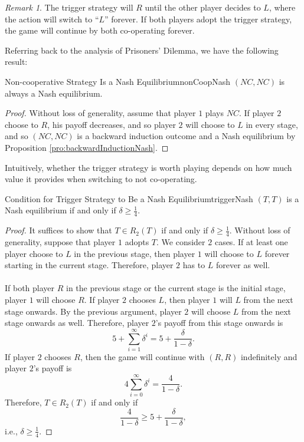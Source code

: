 \documentclass[math]{amznotes}
\theoremstyle{remark}
\newtheorem*{remark}{Remark}
\begin{document}
\begin{notebox}
    \begin{remark}
        The trigger strategy will $R$ until the other player decides to $L$, where the action will switch to ``$L$'' forever. If both players adopt the trigger strategy, the game will continue by both co-operating forever.
    \end{remark}
\end{notebox}
Referring back to the analysis of Prisoners' Dilemma, we have the following result:
\begin{probox}{Non-cooperative Strategy Is a Nash Equilibrium}{nonCoopNash}
    $\left(NC, NC\right)$ is always a Nash equilibrium.
    \tcblower
    \begin{proof}
        Without loss of generality, assume that player $1$ plays $NC$. If player $2$ choose to $R$, his payoff decreases, and so player $2$ will choose to $L$ in every stage, and so $\left(NC, NC\right)$ is a backward induction outcome and a Nash equilibrium by Proposition \ref{pro:backwardInductionNash}.
    \end{proof}
\end{probox}
Intuitively, whether the trigger strategy is worth playing depends on how much value it provides when switching to not co-operating.
\begin{probox}{Condition for Trigger Strategy to Be a Nash Equilibrium}{triggerNash}
    $\left(T, T\right)$ is a Nash equilibrium if and only if $\delta \geq \frac{1}{4}$.
    \tcblower
    \begin{proof}
        It suffices to show that $T \in R_2\left(T\right)$ if and only if $\delta \geq \frac{1}{4}$. Without loss of generality, suppose that player $1$ adopts $T$. We consider $2$ cases. If at least one player choose to $L$ in the previous stage, then player $1$ will choose to $L$ forever starting in the current stage. Therefore, player $2$ has to $L$ forever as well. 
        \\\\
        If both player $R$ in the previous stage or the current stage is the initial stage, player $1$ will choose $R$. If player $2$ chooses $L$, then player $1$ will $L$ from the next stage onwards. By the previous argument, player $2$ will choose $L$ from the next stage onwards as well. Therefore, player $2$'s payoff from this stage onwards is 
        \begin{equation*}
            5 + \sum_{i = 1}^{\infty}\delta^i = 5 + \frac{\delta}{1 - \delta}.
        \end{equation*}
        If player $2$ chooses $R$, then the game will continue with $\left(R, R\right)$ indefinitely and player $2$'s payoff is
        \begin{equation*}
            4\sum_{i = 0}^{\infty}\delta^i = \frac{4}{1 - \delta}.
        \end{equation*}
        Therefore, $T \in R_2\left(T\right)$ if and only if 
        \begin{equation*}
            \frac{4}{1 - \delta} \geq 5 + \frac{\delta}{1 - \delta},
        \end{equation*}
        i.e., $\delta \geq \frac{1}{4}$.
    \end{proof}
\end{probox}
\end{document}
